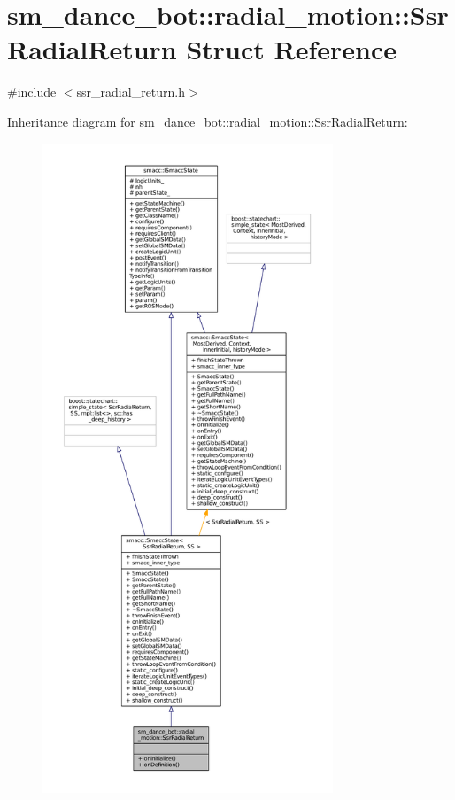\hypertarget{structsm__dance__bot_1_1radial__motion_1_1SsrRadialReturn}{}\section{sm\+\_\+dance\+\_\+bot\+:\+:radial\+\_\+motion\+:\+:Ssr\+Radial\+Return Struct Reference}
\label{structsm__dance__bot_1_1radial__motion_1_1SsrRadialReturn}


{\ttfamily \#include $<$ssr\+\_\+radial\+\_\+return.\+h$>$}



Inheritance diagram for sm\+\_\+dance\+\_\+bot\+:\+:radial\+\_\+motion\+:\+:Ssr\+Radial\+Return\+:
\nopagebreak
\begin{figure}[H]
\begin{center}
\leavevmode
\includegraphics[height=550pt]{structsm__dance__bot_1_1radial__motion_1_1SsrRadialReturn__inherit__graph}
\end{center}
\end{figure}


